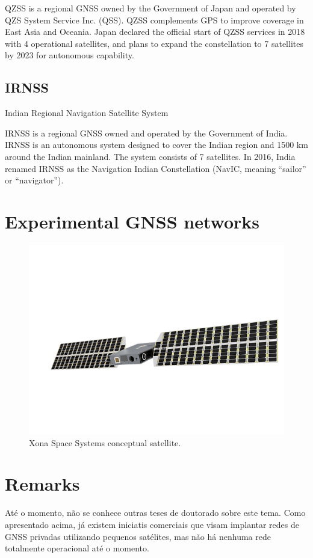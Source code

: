 QZSS is a regional GNSS owned by the Government of Japan and operated by QZS System Service Inc. (QSS). QZSS complements GPS to improve coverage in East Asia and Oceania. Japan declared the official start of QZSS services in 2018 with 4 operational satellites, and plans to expand the constellation to 7 satellites by 2023 for autonomous capability.

\subsection{IRNSS}

Indian Regional Navigation Satellite System \cite{irnss}

IRNSS is a regional GNSS owned and operated by the Government of India. IRNSS is an autonomous system designed to cover the Indian region and 1500 km around the Indian mainland. The system consists of 7 satellites. In 2016, India renamed IRNSS as the Navigation Indian Constellation (NavIC, meaning ``sailor'' or ``navigator'').

\section{Experimental GNSS networks}

\cite{aarestad2020}

\begin{figure}[!ht]
    \begin{center}
        \includegraphics[width=\columnwidth]{figures/xona-satellite}
        \caption{Xona Space Systems conceptual satellite.}
        \label{fig:xona-satellite}
    \end{center}
\end{figure}

\section{Remarks}

Até o momento, não se conhece outras teses de doutorado sobre este tema. Como apresentado acima, já existem iniciatis comerciais que visam implantar redes de GNSS privadas utilizando pequenos satélites, mas não há nenhuma rede totalmente operacional até o momento.
